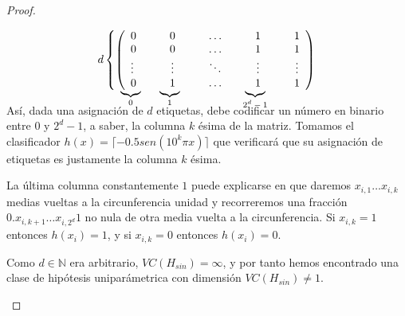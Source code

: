 \begin{proof}
\begin{enumerate}[i]
% 

    
  \[d \left\{\left( 
    \begin{array}{lcccccccccccc}
    0 &&& 0 &&& \ldots &&& 1 &&& 1\\
    0 &&& 0 &&& \ldots &&& 1 &&& 1\\
    \vdots &&& \vdots &&& \ddots &&& \vdots &&& \vdots\\
    \undermat{0}{0} &&& \undermat{1}{1} &&& \ldots &&& \undermat{2^d-1}{1} &&& 1
    \end{array}
  \right)\right.\]
  
  \bigskip
  
  Así, dada una asignación de $d$ etiquetas, debe codificar un número en binario entre $0$ y $2^d-1$, a saber, 
  la columna $k$ ésima de la matriz. Tomamos el clasificador $h(x) = \lceil -0.5 sen(10^k \pi x) \rceil$ que verificará
  que su asignación de etiquetas es justamente la columna $k$ ésima. 
  
  La última columna constantemente $1$ puede explicarse en que daremos $x_{i,1} \ldots x_{i,k}$ medias vueltas a la 
  circunferencia unidad y recorreremos una fracción $0.x_{i,k+1} \ldots x_{i, 2^d} 1$ no nula de otra media vuelta a la 
  circunferencia. Si $x_{i,k} = 1$ entonces $h(x_i) = 1$, y si $x_{i,k}=0$ entonces $h(x_i) = 0$. 
  
  Como $d\in \mathbb{N}$ era arbitrario, $VC(H_{sin}) = \infty$, y por tanto hemos encontrado una clase de hipótesis 
  uniparámetrica con dimensión $VC(H_{sin})\neq 1$.
 \end{enumerate}
\end{proof}


